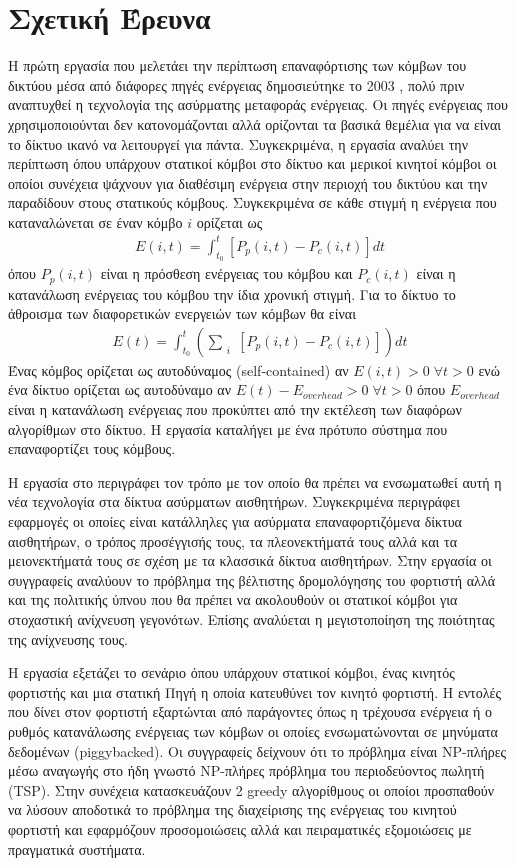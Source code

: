 \section{Σχετική Έρευνα}
Η πρώτη εργασία που μελετάει την περίπτωση επαναφόρτισης των κόμβων του δικτύου μέσα από διάφορες πηγές ενέργειας δημοσιεύτηκε το 2003 \cite{estrin_recharge}, πολύ
πριν αναπτυχθεί η τεχνολογία της ασύρματης μεταφοράς ενέργειας. Οι πηγές ενέργειας που χρησιμοποιούνται δεν κατονομάζονται αλλά ορίζονται τα βασικά θεμέλια για να
είναι το δίκτυο ικανό να λειτουργεί για πάντα. Συγκεκριμένα, η εργασία αναλύει την περίπτωση όπου υπάρχουν στατικοί κόμβοι στο δίκτυο και μερικοί κινητοί κόμβοι οι
οποίοι συνέχεια ψάχνουν για διαθέσιμη ενέργεια στην περιοχή του δικτύου και την παραδίδουν στους στατικούς κόμβους.
Συγκεκριμένα σε κάθε στιγμή η ενέργεια που καταναλώνεται σε έναν κόμβο $i$ ορίζεται ως
\begin{align*}
E(i,t)=\int^{t}_{t_{0}}[P_{p}(i,t)-P_{c}(i,t)]dt
\end{align*}
όπου $P_{p}(i,t)$ είναι η πρόσθεση ενέργειας του κόμβου και $P_{c}(i,t)$ είναι η κατανάλωση ενέργειας του κόμβου την ίδια χρονική στιγμή. Για το δίκτυο το άθροισμα
των διαφορετικών ενεργειών των κόμβων θα είναι
\begin{align*}
E(t)=\int^{t}_{t_{0}}(\sum\limits_{\substack{i}}[P_{p}(i,t)-P_{c}(i,t)])dt
\end{align*}
Ένας κόμβος ορίζεται ως αυτοδύναμος (self-contained) αν $E(i,t)>0 \; \forall t>0$ ενώ ένα δίκτυο ορίζεται ως αυτοδύναμο αν $E(t)-E_{overhead}>0 \; \forall t>0$ όπου
$E_{overhead}$ είναι η κατανάλωση ενέργειας που προκύπτει από την εκτέλεση των διαφόρων αλγορίθμων στο δίκτυο. Η εργασία καταλήγει με ένα πρότυπο σύστημα που
επαναφορτίζει τους κόμβους.

Η εργασία στο \cite{smart_dust_revisited} περιγράφει τον τρόπο με τον οποίο θα πρέπει να ενσωματωθεί αυτή η νέα τεχνολογία στα δίκτυα ασύρματων αισθητήρων.
Συγκεκριμένα περιγράφει εφαρμογές οι οποίες είναι κατάλληλες για ασύρματα επαναφορτιζόμενα δίκτυα αισθητήρων, ο τρόπος προσέγγισής τους, τα πλεονεκτήματά τους αλλά
και τα μειονεκτήματά τους σε σχέση με τα κλασσικά δίκτυα αισθητήρων. Στην εργασία \cite{optimal_scheduling} οι συγγραφείς αναλύουν το πρόβλημα της βέλτιστης
δρομολόγησης του φορτιστή αλλά και της πολιτικής ύπνου που θα πρέπει να ακολουθούν οι στατικοί κόμβοι για στοχαστική ανίχνευση γεγονότων. Επίσης αναλύεται η
μεγιστοποίηση της ποιότητας της ανίχνευσης τους.

Η εργασία \cite{prolonging_j-roc} εξετάζει το σενάριο όπου υπάρχουν στατικοί κόμβοι, ένας κινητός φορτιστής και μια στατική Πηγή η οποία κατευθύνει τον κινητό
φορτιστή. Η εντολές που δίνει στον φορτιστή εξαρτώνται από παράγοντες όπως η τρέχουσα ενέργεια ή ο ρυθμός κατανάλωσης ενέργειας των κόμβων οι οποίες ενσωματώνονται σε
μηνύματα δεδομένων (piggybacked). Οι συγγραφείς δείχνουν ότι το πρόβλημα είναι NP-πλήρες μέσω αναγωγής στο ήδη γνωστό NP-πλήρες πρόβλημα του περιοδεύοντος πωλητή
(TSP). Στην συνέχεια κατασκευάζουν 2 greedy αλγορίθμους οι οποίοι προσπαθούν να λύσουν αποδοτικά το πρόβλημα της διαχείρισης της ενέργειας του κινητού φορτιστή και
εφαρμόζουν προσομοιώσεις αλλά και πειραματικές εξομοιώσεις με πραγματικά συστήματα.

